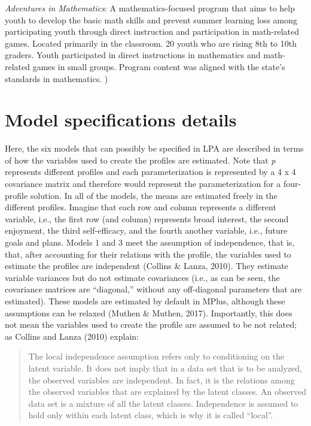 \documentclass[]{book}
\theoremstyle{definition}
\theoremstyle{definition}
\theoremstyle{definition}
\theoremstyle{remark}
\begin{document}
\emph{Adventures in Mathematics}: A mathematics-focused program that
aims to help youth to develop the basic math skills and prevent summer
learning loss among participating youth through direct instruction and
participation in math-related games. Located primarily in the classroom.
20 youth who are rising 8th to 10th graders. Youth participated in
direct instructions in mathematics and math-related games in small
groups. Program content was aligned with the state's standards in
mathematics. )

\section{Model specifications
details}\label{model-specifications-details}

Here, the six models that can possibly be specified in LPA are described
in terms of how the variables used to create the profiles are estimated.
Note that \emph{p} represents different profiles and each
parameterization is represented by a 4 x 4 covariance matrix and
therefore would represent the parameterization for a four-profile
solution. In all of the models, the means are estimated freely in the
different profiles. Imagine that each row and column represents a
different variable, i.e., the first row (and column) represents broad
interest, the second enjoyment, the third self-efficacy, and the fourth
another variable, i.e., future goals and plans. Models 1 and 3 meet the
assumption of independence, that is, that, after accounting for their
relations with the profile, the variables used to estimate the profiles
are independent (Collins \& Lanza, 2010). They estimate variable
variances but do not estimate covariances (i.e., as can be seen, the
covariance matrices are ``diagonal,'' without any off-diagonal
parameters that are estimated). These models are estimated by default in
MPlus, although these assumptions can be relaxed (Muthen \& Muthen,
2017). Importantly, this does not mean the variables used to create the
profile are assumed to be not related; as Collins and Lanza (2010)
explain:

\begin{quote}
The local independence assumption refers only to conditioning on the
latent variable. It does not imply that in a data set that is to be
analyzed, the observed variables are independent. In fact, it is the
relations among the observed variables that are explained by the latent
classes. An observed data set is a mixture of all the latent classes.
Independence is assumed to hold only within each latent class, which is
why it is called ``local''.
\end{quote}
\end{document}
